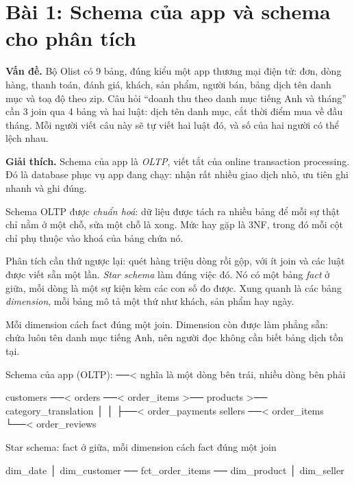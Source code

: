\section{Bài 1: Schema của app và schema cho phân tích}

\textbf{Vấn đề.} Bộ Olist có 9 bảng, đúng kiểu một app thương mại điện tử: đơn, dòng hàng, thanh toán, đánh giá, khách, sản phẩm, người bán, bảng dịch tên danh mục và toạ độ theo zip. Câu hỏi ``doanh thu theo danh mục tiếng Anh và tháng'' cần 3 join qua 4 bảng và hai luật: dịch tên danh mục, cắt thời điểm mua về đầu tháng. Mỗi người viết câu này sẽ tự viết hai luật đó, và số của hai người có thể lệch nhau.

\textbf{Giải thích.} Schema của app là \textit{OLTP}, viết tắt của online transaction processing. Đó là database phục vụ app đang chạy: nhận rất nhiều giao dịch nhỏ, ưu tiên ghi nhanh và ghi đúng.

Schema OLTP được \textit{chuẩn hoá}: dữ liệu được tách ra nhiều bảng để mỗi sự thật chỉ nằm ở một chỗ, sửa một chỗ là xong. Mức hay gặp là 3NF, trong đó mỗi cột chỉ phụ thuộc vào khoá của bảng chứa nó.

Phân tích cần thứ ngược lại: quét hàng triệu dòng rồi gộp, với ít join và các luật được viết sẵn một lần. \textit{Star schema} làm đúng việc đó. Nó có một bảng \textit{fact} ở giữa, mỗi dòng là một sự kiện kèm các con số đo được. Xung quanh là các bảng \textit{dimension}, mỗi bảng mô tả một thứ như khách, sản phẩm hay ngày.

Mỗi dimension cách fact đúng một join. Dimension còn được làm phẳng sẵn:  chứa luôn tên danh mục tiếng Anh, nên người đọc không cần biết bảng dịch tồn tại.

\begin{codeblock}
Schema của app (OLTP):  ──<  nghĩa là một dòng bên trái, nhiều dòng bên phải

customers ──< orders ──< order_items >── products >── category_translation
                │             │
                ├──< order_payments        sellers ──< order_items
                └──< order_reviews

Star schema:  fact ở giữa, mỗi dimension cách fact đúng một join

                       dim_date
                          │
      dim_customer ── fct_order_items ── dim_product
                          │
                      dim_seller
\end{codeblock}

